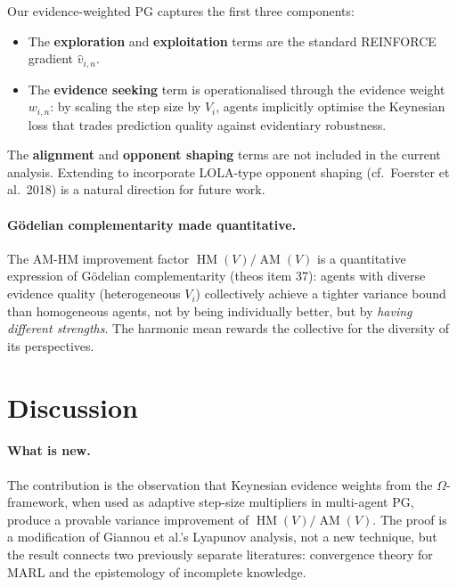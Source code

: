 \documentclass[11pt,a4paper]{article}
\DeclareMathOperator{\AM}{AM}
\DeclareMathOperator{\HM}{HM}
\begin{document}
Our evidence-weighted PG captures the first three components:
\begin{itemize}
    \item The \textbf{exploration} and \textbf{exploitation} terms are the standard REINFORCE gradient $\hat{v}_{i,n}$.
    \item The \textbf{evidence seeking} term is operationalised through the evidence weight $w_{i,n}$: by scaling the step size by $V_i$, agents implicitly optimise the Keynesian loss that trades prediction quality against evidentiary robustness.
\end{itemize}

The \textbf{alignment} and \textbf{opponent shaping} terms are not included in the current analysis. Extending  to incorporate LOLA-type opponent shaping (cf.\ Foerster et al.\ 2018) is a natural direction for future work.

\paragraph{Gödelian complementarity made quantitative.} The AM-HM improvement factor $\HM(V)/\AM(V)$ is a quantitative expression of Gödelian complementarity (theos item 37): agents with diverse evidence quality (heterogeneous $V_i$) collectively achieve a tighter variance bound than homogeneous agents, not by being individually better, but by \emph{having different strengths}. The harmonic mean rewards the collective for the diversity of its perspectives.


\section{Discussion}
\label{sec:discussion}

\paragraph{What is new.} The contribution is the observation that Keynesian evidence weights from the $\Omega$-framework, when used as adaptive step-size multipliers in multi-agent PG, produce a provable variance improvement of $\HM(V)/\AM(V)$. The proof is a modification of Giannou et al.'s Lyapunov analysis, not a new technique, but the result connects two previously separate literatures: convergence theory for MARL and the epistemology of incomplete knowledge.
\end{document}
